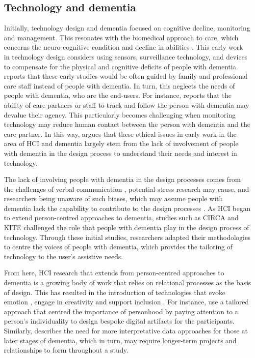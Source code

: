 \subsection{Technology and dementia}
\label{Context:Design}
Initially, technology design and dementia focused on cognitive decline, monitoring and management. This resonates with the biomedical approach to care, which concerns the neuro-cognitive condition and decline in abilities \citep{o2022conceptualizing}. This early work in technology design considers using sensors, surveillance technology, and devices to compensate for the physical and cognitive deficits of people with dementia. \cite{bharucha2009intelligent} reports that these early studies would be often guided by family and professional care staff instead of people with dementia. In turn, this neglects the needs of people with dementia, who are the end-users. For instance, \cite{astell2006technology} reports that the ability of care partners or staff to track and follow the person with dementia may devalue their agency. This particularly becomes challenging when monitoring technology may reduce human contact between the person with dementia and the care partner. In this way, \cite{astell2006technology} argues that these ethical issues in early work in the area of HCI and dementia largely stem from the lack of involvement of people with dementia in the design process to understand their needs and interest in technology.

The lack of involving people with dementia in the design processes comes from the challenges of verbal communication \citep{majlesi2017video}, potential stress research may cause, and researchers being unaware of such biases, which may assume people with dementia lack the capability to contribute to the design processes \citep{manthorpe_person-centered_2016}. As HCI began to extend person-centred approaches to dementia, studies such as CIRCA \citep{astell_stimulating_2010} and KITE \citep{robinson2009keeping} challenged the role that people with dementia play in the design process of technology. Through these initial studies, researchers adapted their methodologies to centre the voices of people with dementia, which provides the tailoring of technology to the user's assistive needs. 

From here, HCI research that extends from person-centred approaches to dementia is a growing body of work that relies on relational processes as the basis of design. This has resulted in the introduction of technologies that evoke emotion \citep{wallace_enabling_2012-1,houben_foregrounding_2019,dixon_approach_2020} , engage in creativity \citep{lindsay_empathy_2012,morrissey_im_2016} and support inclusion \citep{welsh_ticket_2018,foley_printer_2019,treadaway_sensor_2016}. For instance, \cite{wallace_design-led_2013} use a tailored approach that centred the importance of personhood by paying attention to a person’s individuality to design bespoke digital artifacts for the participants. Similarly, \cite{lindsay_empathy_2012} describes the need for more interpretative data approaches for those at later stages of dementia, which in turn, may require longer-term projects and relationships to form throughout a study. 

